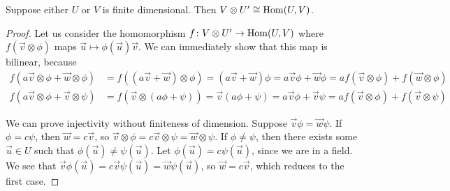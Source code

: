 \begin{theorem}
    Suppose either \(U\) or \(V\) is finite dimensional.
    Then \(V \otimes U' \cong \operatorname{Hom}(U,V)\).
\end{theorem}
\begin{proof}
    Let us consider the homomorphism \(f\colon V \otimes U'\to\operatorname{Hom}(U,V)\)
    where \(f(\vec{v}\otimes\phi)\) maps \(\vec{u} \mapsto \phi(\vec{u})\vec{v}\).
    We can immediately show that this map is bilinear, because
    \begin{align*}
        f(a\vec{v}\otimes\phi + \vec{w}\otimes\phi)
        &= f((a\vec{v}+\vec{w})\otimes\phi)
        = (a\vec{v}+\vec{w})\phi
        = a\vec{v}\phi + \vec{w}\phi
        = af(\vec{v}\otimes\phi) + f(\vec{w}\otimes\phi) \\
        f(a\vec{v}\otimes\phi + \vec{v}\otimes\psi)
        &= f(\vec{v}\otimes(a\phi+\psi))
        = \vec{v}(a\phi+\psi)
        = a\vec{v}\phi + \vec{v}\psi
        = af(\vec{v}\otimes\phi) + f(\vec{v}\otimes\psi)
    \end{align*}

    We can prove injectivity without finiteness of dimension.
    Suppose \(\vec{v}\phi = \vec{w}\psi\).
    If \(\phi = c\psi\), then \(\vec{w} = c\vec{v}\),
    so \(\vec{v}\otimes\phi = c\vec{v}\otimes\psi = \vec{w}\otimes\psi\).
    If \(\phi \neq \psi\), then there exists some \(\vec{u} \in U\)
    such that \(\phi(\vec{u}) \neq \psi(\vec{u})\).
    Let \(\phi(\vec{u}) = c\psi(\vec{u})\), since we are in a field.
    We see that \(\vec{v}\phi(\vec{u}) = c\vec{v}\psi(\vec{u}) = \vec{w}\psi(\vec{u})\),
    so \(\vec{w} = c\vec{v}\), which reduces to the first case.


\end{proof}
